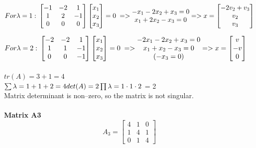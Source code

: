 \documentclass[eng,openany]{mgr}
\begin{document}
\begin{math}
For \lambda = 1:\\
\begin{bmatrix}
-1 & -2 & 1  \\
1 & 2 & -1 \\
0 & 0 & 0 
\end{bmatrix}
\begin{bmatrix}
x_1 \\
x_2 \\
x_3
\end{bmatrix}
= 0\; =>
\begin{matrix}
-x_1 -2x_2+x_3 = 0\\
x_1+2x_2-x_3 = 0\\

\end{matrix}
=>
x = 
\begin{bmatrix}
-2v_2+v_3\\
v_2 \\
v_3
\end{bmatrix}
\end{math}

\begin{math}
For \lambda = 2:\\
\begin{bmatrix}
-2 & -2 & 1  \\
1 & 1 & -1 \\
0 & 0 & -1 
\end{bmatrix}
\begin{bmatrix}
x_1 \\
x_2 \\
x_3
\end{bmatrix}
= 0\; =>
\begin{matrix}
-2x_1 -2x_2+x_3 = 0\\
x_1+x_2-x_3 = 0\\
(-x_3=0)
\end{matrix}
=>
x = 
\begin{bmatrix}
v\\
-v \\
0
\end{bmatrix}
\end{math}
\\ \\ 
$tr(A) = 3 +1 = 4$\\
$\sum \lambda = 1+1+2 = 4
\\ \\
det(A) = 2\\
\prod \lambda = 1 \cdot 1 \cdot 2$ = 2
\\
Matrix determinant is non--zero, so the matrix is not singular.
\\
\\
\textbf{Matrix A3}
\[
A_3 =
\begin{bmatrix}
	4 & 1 & 0  \\
	1 & 4 & 1 \\
	0 & 1 & 4 
\end{bmatrix}
\]
\end{document}
